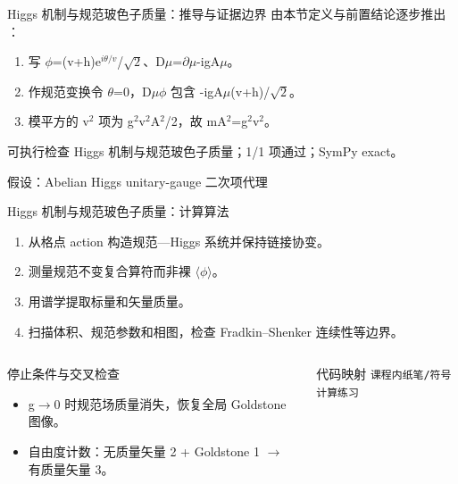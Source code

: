 \begin{frame}[t]{Higgs 机制与规范玻色子质量：推导与证据边界}
\footnotesize
{}\quad 由本节定义与前置结论逐步推出 ：
\begin{enumerate}
\item 写 \ensuremath{\phi}=(v+h)e\ensuremath{^{i\theta/v}}/\allowbreak{}\ensuremath{\sqrt{2}}、D\ensuremath{\mu}=\ensuremath{\partial}\ensuremath{\mu}-igA\ensuremath{\mu}。
\item 作规范变换令 \ensuremath{\theta}=0，D\ensuremath{\mu}\ensuremath{\phi} 包含 -igA\ensuremath{\mu}(v+h)/\allowbreak{}\ensuremath{\sqrt{2}}。
\item 模平方的 v\ensuremath{^{2}} 项为 g\ensuremath{^{2}}v\ensuremath{^{2}}A\ensuremath{^{2}}/\allowbreak{}2，故 mA\ensuremath{^{2}}=g\ensuremath{^{2}}v\ensuremath{^{2}}。
\end{enumerate}\begin{block}{可执行检查}
\quad Higgs 机制与规范玻色子质量；1/1 项通过；SymPy exact。
\par\scriptsize 假设：Abelian Higgs unitary-gauge 二次项代理
\end{block}
\end{frame}

\begin{frame}[t]{Higgs 机制与规范玻色子质量：计算算法}
\footnotesize
{}\begin{enumerate}
\item 从格点 action 构造规范—Higgs 系统并保持链接协变。
\item 测量规范不变复合算符而非裸 \ensuremath{\langle}\ensuremath{\phi}\ensuremath{\rangle}。
\item 用谱学提取标量和矢量质量。
\item 扫描体积、规范参数和相图，检查 Fradkin--Shenker 连续性等边界。
\end{enumerate}\begin{columns}[T,onlytextwidth]
\begin{block}{停止条件与交叉检查}\scriptsize\begin{itemize}
\item[\CheckMark] g\ensuremath{\rightarrow}0 时规范场质量消失，恢复全局 Goldstone 图像。
\item[\CheckMark] 自由度计数：无质量矢量 2 + Goldstone 1 \ensuremath{\rightarrow} 有质量矢量 3。
\end{itemize}\end{block}
\begin{block}{代码映射}
\scriptsize \texttt{课程内纸笔/\allowbreak{}符号计算练习}
\end{block}\end{columns}\end{frame}

